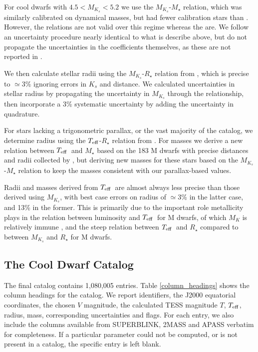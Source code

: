 \documentclass[twocolumn]{aastex62}
\newcommand{\teff}{$T_{\rm eff}$}
\begin{document}
For cool dwarfs with $4.5<M_{K_s}<5.2$ we use the \citet{Delfosse2000} $M_{K_s}$-$M_\star$ relation, which was similarly calibrated on dynamical masses, but had fewer calibration stars than \citet{Benedict2016}.  However, the \citet{Benedict2016} relations are not valid over this regime whereas the \citet{Delfosse2000} are.  We follow an uncertainty procedure nearly identical to what is describe above, but do not propagate the uncertainties in the coefficients themselves, as these are not reported in \citet{Delfosse2000}.

We then calculate stellar radii using the $M_{K_s}$-$R_\star$ relation from \citet{Mann2015}, which is precise to $\simeq$3\% ignoring errors in $K_s$ and distance.  We calculated uncertainties in stellar radius by propagating the uncertainty in $M_{K_s}$ through the relationship, then incorporate a 3\% systematic uncertainty by adding the uncertainty in quadrature.

For stars lacking a trigonometric parallax, or the vast majority of the catalog, we determine radius using the \teff-$R_\star$ relation from \citet{Mann2015}. For masses we derive a new relation between \teff\ and $M_\star$ based on the 183 M dwarfs with precise distances and radii collected by \citet{Mann2015}, but deriving new masses for these stars based on the \citet{Benedict2016} $M_{K_s}$-$M_\star$ relation to keep the masses consistent with our parallax-based values.

Radii and masses derived from \teff\ are almost always less precise than those derived using $M_{K_s}$, with best case errors on radius of $\simeq$3\% in the latter case, and 13\% in the former. This is primarily due to the important role metallicity plays in the relation between luminosity and \teff\ for M dwarfs, of which $M_{K}$ is relatively immune \citep{Delfosse2000,Mann2015}, and the steep relation between \teff\ and $R_\star$ compared to between $M_{K_s}$ and $R_\star$ for M dwarfs. 

\subsection{The Cool Dwarf Catalog}

The final catalog contains 1,080,005 entries.  Table \ref{column_headings} shows the column headings for the catalog.  We report identifiers, the J2000 equatorial coordinates, the chosen $V$ magnitude, the calculated TESS magnitude $T$, $T_{\rm eff}$, radius, mass,  corresponding uncertainties and flags.  For each entry, we also include the columns available from SUPERBLINK, 2MASS and APASS verbatim for completeness.  If a particular parameter could not be computed, or is not present in a catalog, the specific entry is left blank.
\end{document}
